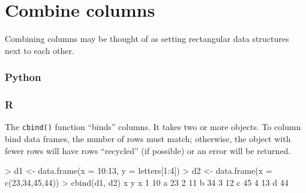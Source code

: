 \documentclass[
]{book}
\newenvironment{Shaded}{\begin{snugshade}}{\end{snugshade}}
\newcommand{\AttributeTok}[1]{\textcolor[rgb]{0.77,0.63,0.00}{#1}}
\newcommand{\DecValTok}[1]{\textcolor[rgb]{0.00,0.00,0.81}{#1}}
\newcommand{\FunctionTok}[1]{\textcolor[rgb]{0.00,0.00,0.00}{#1}}
\newcommand{\NormalTok}[1]{#1}
\newcommand{\OtherTok}[1]{\textcolor[rgb]{0.56,0.35,0.01}{#1}}
\newcommand{\SpecialCharTok}[1]{\textcolor[rgb]{0.00,0.00,0.00}{#1}}
\begin{document}
\hypertarget{combine-columns}{%
\section{Combine columns}\label{combine-columns}}

Combining columns may be thought of as setting rectangular data structures next to each other.

\hypertarget{python-29}{%
\subsubsection*{Python}\label{python-29}}

\hypertarget{r-29}{%
\subsubsection*{R}\label{r-29}}

The \texttt{cbind()} function ``binds'' columns. It takes two or more objects. To column bind data frames, the number of rows must match; otherwise, the object with fewer rows will have rows ``recycled'' (if possible) or an error will be returned.

\begin{Shaded}
\begin{Highlighting}[]
\SpecialCharTok{\textgreater{}}\NormalTok{ d1 }\OtherTok{\textless{}{-}} \FunctionTok{data.frame}\NormalTok{(}\AttributeTok{x =} \DecValTok{10}\SpecialCharTok{:}\DecValTok{13}\NormalTok{, }\AttributeTok{y =}\NormalTok{ letters[}\DecValTok{1}\SpecialCharTok{:}\DecValTok{4}\NormalTok{])}
\SpecialCharTok{\textgreater{}}\NormalTok{ d2 }\OtherTok{\textless{}{-}} \FunctionTok{data.frame}\NormalTok{(}\AttributeTok{x =} \FunctionTok{c}\NormalTok{(}\DecValTok{23}\NormalTok{,}\DecValTok{34}\NormalTok{,}\DecValTok{45}\NormalTok{,}\DecValTok{44}\NormalTok{))}
\SpecialCharTok{\textgreater{}} \FunctionTok{cbind}\NormalTok{(d1, d2)}
\NormalTok{   x y  x}
\DecValTok{1} \DecValTok{10}\NormalTok{ a }\DecValTok{23}
\DecValTok{2} \DecValTok{11}\NormalTok{ b }\DecValTok{34}
\DecValTok{3} \DecValTok{12}\NormalTok{ c }\DecValTok{45}
\DecValTok{4} \DecValTok{13}\NormalTok{ d }\DecValTok{44}
\end{Highlighting}
\end{Shaded}
\end{document}
